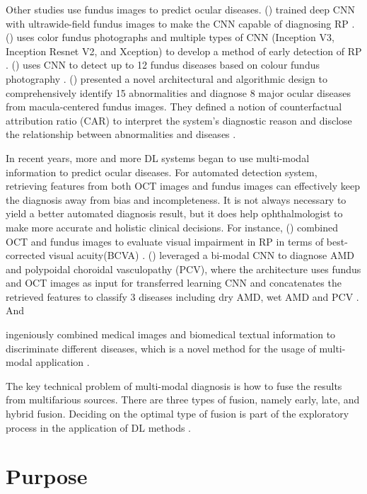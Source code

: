 \documentclass{article}
\newcommand{\authyear}[1]{\citeauthor{#1} (\citeyear{#1})}
\begin{document}
		Other studies use fundus images to predict ocular diseases.
		\authyear{masumoto2019accuracy} trained deep CNN with ultrawide-field fundus images to make the CNN capable of diagnosing RP \autocite{masumoto2019accuracy}. 
		\authyear{chen2021artificial} uses color fundus photographs and multiple types of CNN (Inception V3, Inception Resnet V2, and Xception) to develop a method of early detection of RP \autocite{chen2021artificial}. 
		\authyear{li2022development} uses CNN to detect up to 12 fundus diseases based on colour fundus photography \autocite{li2022development}.  \authyear{Son2023} presented a novel architectural and algorithmic design to comprehensively identify 15 abnormalities and diagnose 8 major ocular diseases from macula-centered fundus images.  They defined a notion of counterfactual attribution ratio (CAR) to interpret the system's diagnostic reason and disclose the relationship between abnormalities and diseases \autocite{Son2023}.
		
		In recent years, more and more DL systems began to use multi-modal information to predict ocular diseases.  For automated detection system, retrieving features from both OCT images and fundus images can effectively keep the diagnosis away from bias and incompleteness.  It is not always necessary to yield a better automated diagnosis result, but it does help ophthalmologist to make more accurate and holistic clinical decisions.  For instance, \authyear{liu2023prediction} combined OCT and fundus images to evaluate visual impairment in RP in terms of best-corrected visual acuity(BCVA) \autocite{liu2023prediction}.  \authyear{Xu2021} leveraged a bi-modal CNN to diagnose AMD and polypoidal choroidal vasculopathy (PCV), where the architecture uses fundus and OCT images as input for transferred learning CNN and concatenates the retrieved features to classify 3 diseases including dry AMD, wet AMD and PCV \autocite{Xu2021}.  And \author{Andrearczyk2018} ingeniously combined medical images and biomedical textual information to discriminate different diseases, which is a novel method for the usage of multi-modal application \autocite{Andrearczyk2018}.
		
		The key technical problem of multi-modal diagnosis is how to fuse the results from multifarious sources.  There are three types of fusion, namely early, late, and hybrid fusion.  Deciding on the optimal type of fusion is part of the exploratory process in the application of DL methods \autocite{Ichhpujani_Thakur_2021}.
		
		
	\section{Purpose}
		
\end{document}
